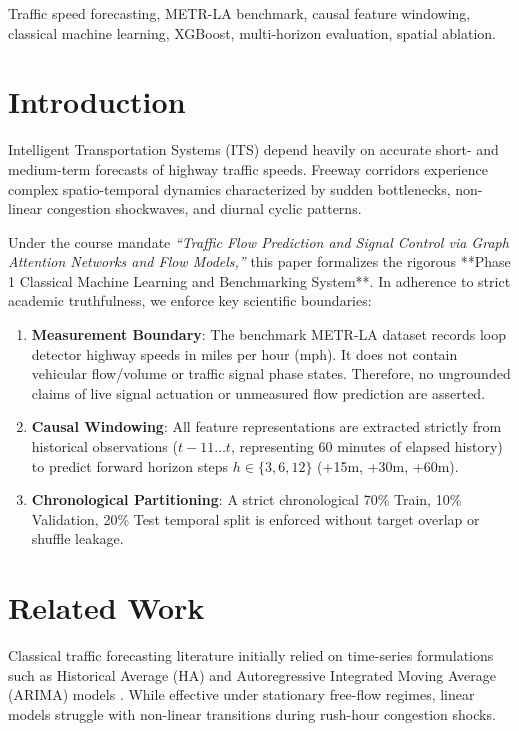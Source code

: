\documentclass[conference]{IEEEtran}
\begin{document}
\begin{IEEEkeywords}
Traffic speed forecasting, METR-LA benchmark, causal feature windowing, classical machine learning, XGBoost, multi-horizon evaluation, spatial ablation.
\end{IEEEkeywords}

\section{Introduction}
Intelligent Transportation Systems (ITS) depend heavily on accurate short- and medium-term forecasts of highway traffic speeds. Freeway corridors experience complex spatio-temporal dynamics characterized by sudden bottlenecks, non-linear congestion shockwaves, and diurnal cyclic patterns. 

Under the course mandate \textit{``Traffic Flow Prediction and Signal Control via Graph Attention Networks and Flow Models,''} this paper formalizes the rigorous **Phase 1 Classical Machine Learning and Benchmarking System**. In adherence to strict academic truthfulness, we enforce key scientific boundaries:
\begin{enumerate}
    \item \textbf{Measurement Boundary}: The benchmark METR-LA dataset records loop detector highway speeds in miles per hour (mph). It does not contain vehicular flow/volume or traffic signal phase states. Therefore, no ungrounded claims of live signal actuation or unmeasured flow prediction are asserted.
    \item \textbf{Causal Windowing}: All feature representations are extracted strictly from historical observations ($t-11 \dots t$, representing 60 minutes of elapsed history) to predict forward horizon steps $h \in \{3, 6, 12\}$ (+15m, +30m, +60m).
    \item \textbf{Chronological Partitioning}: A strict chronological 70\% Train, 10\% Validation, 20\% Test temporal split is enforced without target overlap or shuffle leakage.
\end{enumerate}

\section{Related Work}
Classical traffic forecasting literature initially relied on time-series formulations such as Historical Average (HA) and Autoregressive Integrated Moving Average (ARIMA) models \cite{williams2003modeling}. While effective under stationary free-flow regimes, linear models struggle with non-linear transitions during rush-hour congestion shocks. 
\end{document}
